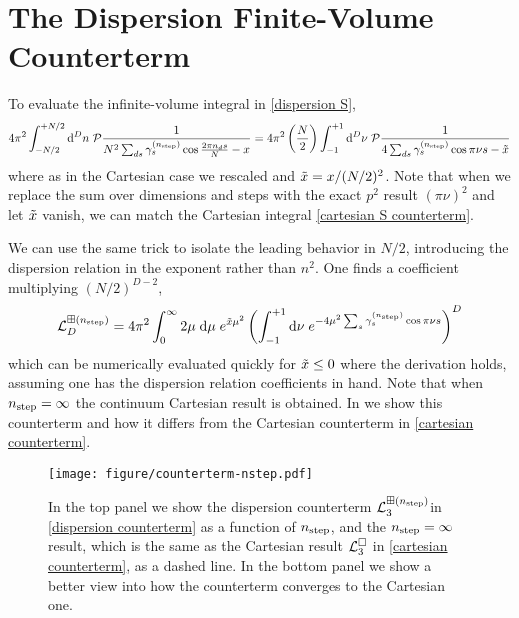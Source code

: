 \section{The Dispersion \Luscher Finite-Volume Counterterm}\label{sec:counterterm/dispersion}

To evaluate the infinite-volume integral in \eqref{dispersion S},
\begin{equation}
    4\pi^2 \int_{-N/2}^{+N/2} \mathrm{d}^Dn\; \mathcal{P} \frac{1}{N^2 \sum_{ds} \gamma^{({n_\text{step}})}_s \cos \frac{2\pi n_d s}{N} - x}
    =
    4\pi^2 \left(\frac{N}{2}\right) \int_{-1}^{+1} \mathrm{d}^D\nu\; \mathcal{P} \frac{1}{4\sum_{ds} \gamma^{({n_\text{step}})}_s \cos \pi \nu s - \tilde{x}}
\end{equation}
where as in the Cartesian case we rescaled and $\tilde{x} = x/(N/2)^2$.
Note that when we replace the sum over dimensions and steps with the exact $p^2$ result $(\pi \nu)^2$ and let $\tilde{x}$ vanish, we can match the Cartesian integral \eqref{cartesian S counterterm}.

We can use the same trick to isolate the leading behavior in $N/2$, introducing the dispersion relation in the exponent rather than $n^2$.
One finds a coefficient multiplying $(N/2)^{D-2}$,
\begin{equation}
    \label{eq:dispersion counterterm}
    \mathcal{L}^{\boxplus ({n_\text{step}})}_D = 4 \pi^2 \int_{0}^{\infty} 2\mu\; \mathrm{d}\mu\; e^{\tilde{x}\mu^2}\left(\int_{-1}^{+1} \mathrm{d}\nu\; e^{-4\mu^2 \sum_s \gamma_s^{({n_\text{step}})} \cos \pi \nu s}\right)^D
\end{equation}
which can be numerically evaluated quickly for $\tilde{x}\leq0$ where the derivation holds, assuming one has the dispersion relation coefficients in hand.
Note that when ${n_\text{step}}=\infty$ the continuum Cartesian result is obtained.
In  we show this counterterm and how it differs from the Cartesian counterterm in \eqref{cartesian counterterm}.

\begin{figure}
    \texttt{[image: figure/counterterm-nstep.pdf]}
    \caption{In the top panel we show the dispersion counterterm $\mathcal{L}^{\boxplus ({n_\text{step}})}_{3}$in \eqref{dispersion counterterm} as a function of ${n_\text{step}}$, and the ${n_\text{step}}=\infty$ result, which is the same as the Cartesian result $\mathcal{L}^{\square}_3$ in \eqref{cartesian counterterm}, as a dashed line.  In the bottom panel we show a better view into how the counterterm converges to the Cartesian one.
    }
    \label{fig:nstep counterterm}
\end{figure}
